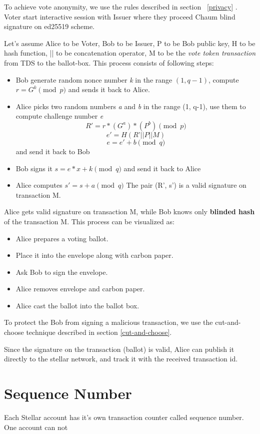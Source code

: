 \documentclass[runningheads]{llncs}
\begin{document}
To achieve vote anonymity, we use the rules described in section ~\ref{privacy} . Voter start interactive session with Issuer where they proceed Chaum blind signature \cite{blindsignatureschaum} on ed25519 scheme. 

Let's assume Alice to be Voter, Bob to be Issuer, P to be Bob public key, H to be hash function, || to be concatenation operator, M to be the \textit{vote token transaction} from TDS to the ballot-box.
This process consists of following steps:
\begin{itemize}
\item Bob generate random nonce number \textit{k} in the range $(1, q-1)$, compute 
\(r = G^k \pmod{p}\)
and sends it back to Alice.
\item Alice picks two random numbers \textit{a} and \textit{b} in the range (1, q-1), use them to compute challenge number \textit{e}
\[R' = r*(G^a)*(P^b) \pmod{p}\]
\[e' = H(R’|| P || M)\]
\[e = e' + b \pmod{q}\]
and send it back to Bob
\item Bob signs it 
\(s = e*x + k \pmod{q}\)
and send it back to Alice
\item Alice computes 
$s' = s + a \pmod{q}$
The pair (R', s') is a valid signature on transaction M.
\end{itemize}
Alice gets valid signature on transaction M, while Bob knows only \textbf{blinded hash} of the transaction M.
This process can be visualized as:
\begin{itemize}
    \item Alice prepares a voting ballot.
    \item Place it into the envelope along with carbon paper.
    \item Ask Bob to sign the envelope.
    \item Alice removes envelope and carbon paper.
    \item Alice cast the ballot into the ballot box.
\end{itemize}

To protect the Bob from signing a malicious transaction, we use the cut-and-choose technique described in section \ref{cut-and-choose}.

Since the signature on the transaction (ballot) is valid, Alice can publish it directly to the stellar network, and track it with the received transaction id. 

\section{Sequence Number}
Each Stellar account has it's own transaction counter called sequence number. One account can not 
\end{document}
